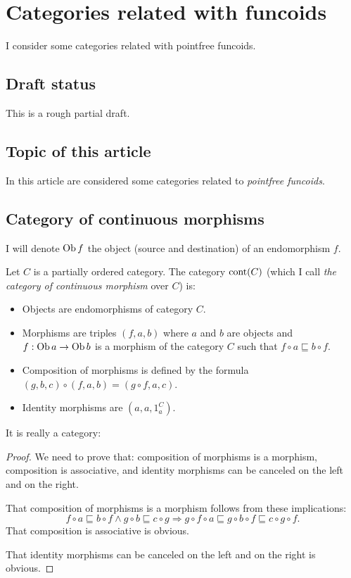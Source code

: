 \chapter{Categories related with funcoids}

I consider some categories related with pointfree funcoids.

\section{Draft status}

This is a rough partial draft.

\section{Topic of this article}

In this article are considered some categories related to \emph{pointfree
funcoids}.

\section{Category of continuous morphisms}

I will denote $\operatorname{Ob} f$ the object (source and destination) of an
endomorphism $f$.

\begin{defn}
  Let $C$ is a partially ordered category. The category
  $\operatorname{cont} (C)$ (which I call \emph{the category of
  continuous morphism} over $C$) is:
  \begin{itemize}
    \item Objects are endomorphisms of category $C$.
    
    \item Morphisms are triples $(f , a , b)$ where $a$ and $b$ are objects
    and $f : \operatorname{Ob} a \rightarrow \operatorname{Ob} b$ is a morphism of the
    category $C$ such that $f \circ a \sqsubseteq b \circ f$.
    
    \item Composition of morphisms is defined by the formula $(g , b , c)
    \circ (f , a , b) = (g \circ f , a , c)$.
    
    \item Identity morphisms are $(a , a , 1^C_a)$.
  \end{itemize}
\end{defn}

It is really a category:

\begin{proof}
  We need to prove that: composition of morphisms is a morphism, composition
  is associative, and identity morphisms can be canceled on the left and on
  the right.
  
  That composition of morphisms is a morphism follows from these implications:
  \[ f \circ a \sqsubseteq b \circ f \wedge g \circ b \sqsubseteq c \circ g
     \Rightarrow g \circ f \circ a \sqsubseteq g \circ b \circ f \sqsubseteq c
     \circ g \circ f. \]
  That composition is associative is obvious.
  
  That identity morphisms can be canceled on the left and on the right is
  obvious.
\end{proof}

